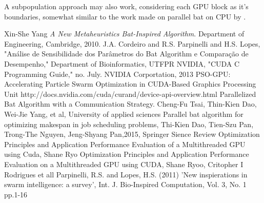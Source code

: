 \documentclass[conference]{IEEEtran}
\begin{document}
A subpopulation approach may also work, considering each GPU block as
it's boundaries, somewhat similar to the work made on parallel bat on
CPU by \cite{paralellCPU}.

\begin{thebibliography}{1}
    Xin-She Yang \emph{A New Metaheuristics Bat-Inspired Algorithm}. Department of Engineering, Cambridge, 2010.
    J.A. Cordeiro and R.S. Parpinelli and H.S. Lopes, "Análise de Sensibilidade dos Parâmetros do Bat Algorithm e Comparação de Desempenho," Department of Bioinformatics, UTFPR
    NVIDIA, "CUDA C Programming Guide," no. July. NVIDIA Corportation, 2013
    PSO-GPU: Accelerating Particle Swarm Optimization in CUDA-Based Graphics Processing Unit
    http://docs.nvidia.com/cuda/curand/device-api-overview.html
    Parallelized Bat Algorithm with a Communication Strategy. Cheng-Fu Tsai, Thin-Kien Dao, Wei-Jie Yang, et al, University of applied sciences
    Parallel bat algorithm for optimizing makespan in job scheduling problems, Thi-Kien Dao, Tien-Szu Pan, Trong-The Nguyen, Jeng-Shyang Pan,2015, Springer Sience Review
    Optimization Principles and Application Performance Evaluation of a Multithreaded GPU using Cuda, Shane Ryo
    Optimization Principles and Application Performance Evaluation on a Multithreaded GPU using CUDA, Shane Ryoo, Critopher I Rodrigues et all
    Parpinelli, R.S. and Lopes, H.S. (2011) 'New inspierations in swarm intelligence: a survey', Int. J. Bio-Inspired Computation, Vol. 3, No. 1 pp.1-16
\end{thebibliography}
\end{document}
